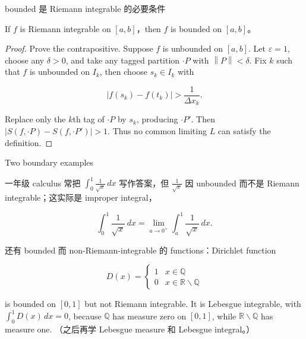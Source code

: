 \begin{theorem}{bounded 是 Riemann integrable 的必要条件}

If \(f\) is Riemann integrable on \(\left\lbrack {a,b} \right\rbrack\)，then \(f\) is bounded on \(\left\lbrack {a,b} \right\rbrack\)。

\end{theorem}

\begin{proof}

Prove the contrapositive. Suppose \(f\) is unbounded on \(\left\lbrack {a,b} \right\rbrack\). Let \(\varepsilon = 1\), choose any \(\delta > 0\), and take any tagged partition \(\cdot P\) with \(\left\| P \right\| < \delta\). Fix \(k\) such that \(f\) is unbounded on \(I_{k}\), then choose \(s_{k} \in I_{k}\) with

\[\left| {f\left( s_{k} \right) - f\left( t_{k} \right)} \right| > \frac{1}{\Delta x_{k}}.\]

Replace only the \(k\)th tag of \(\cdot P\) by \(s_{k}\), producing \(\cdot P'\). Then \(\left| {S\left( {f, \cdot P} \right) - S\left( {f, \cdot P'} \right)} \right| > 1\). Thus no common limiting \(L\) can satisfy the definition.

\end{proof}

\begin{qlremark}{Two boundary examples}

一年级 calculus 常把 \(\int_{0}^{1}\frac{1}{\sqrt{x}}\, dx\) 写作答案，但 \(\frac{1}{\sqrt{x}}\) 因 unbounded 而不是 Riemann integrable；这实际是 improper integral，

\[\int_{0}^{1}\frac{1}{\sqrt{x}}\, dx = \lim\limits_{a\rightarrow 0^{+}}\int_{a}^{1}\frac{1}{\sqrt{x}}\, dx.\]

还有 bounded 而 non-Riemann-integrable 的 functions：Dirichlet function

\[D(x) = \left\{ \begin{matrix}
1 & {x \in \mathbb{Q}} \\
0 & {x \in \mathbb{R} \smallsetminus \mathbb{Q}}
\end{matrix} \right.\]

is bounded on \(\left\lbrack {0,1} \right\rbrack\) but not Riemann integrable. It is Lebesgue integrable, with \(\int_{0}^{1}D(x)\, dx = 0\), because \(\mathbb{Q}\) has measure zero on \(\left\lbrack {0,1} \right\rbrack\), while \(\mathbb{R} \smallsetminus \mathbb{Q}\) has measure one. （之后再学 Lebesgue measure 和 Lebesgue integral。）

\end{qlremark}


